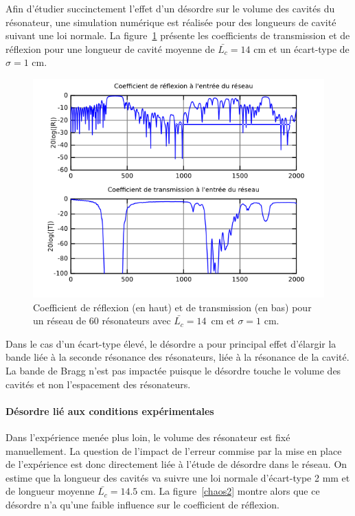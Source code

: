 Afin d'étudier succinctement l'effet d'un désordre sur le volume des cavités du résonateur, une simulation numérique est réalisée pour des longueurs de cavité suivant une loi normale. La figure~\ref{chaos10} présente les coefficients de transmission et de réflexion pour une longueur de cavité moyenne de $\bar{L_c}=14$ cm et un écart-type  de $\sigma = 1$ cm.
\begin{figure}
	\centering
	\includegraphics[scale=0.7]{./images_chp1/chaos_10mm.png}
	\caption{\label{chaos10} Coefficient de réflexion (en haut) et de transmission (en bas) pour un réseau de 60 résonateurs avec $\bar{L_c}=14$~cm et $\sigma =1$ cm.}
\end{figure}

Dans le cas d'un écart-type élevé, le désordre a pour principal effet d'élargir la bande liée à la seconde résonance des résonateurs, liée à la résonance de la cavité. La bande de Bragg n'est pas impactée puisque le désordre touche le volume des cavités et non l'espacement des résonateurs.

\paragraph{Désordre lié aux conditions expérimentales}
Dans l'expérience menée plus loin, le volume des résonateur est fixé manuellement. La question de l'impact de l'erreur commise par la mise en place de l'expérience est donc directement liée à l'étude de désordre dans le réseau. On estime que la longueur des cavités va suivre une loi normale d'écart-type 2 mm et de longueur moyenne $\bar{L_c}=14.5$ cm. La figure~\ref{chaos2} montre alors que ce désordre n'a qu'une faible influence sur le coefficient de réflexion. 

